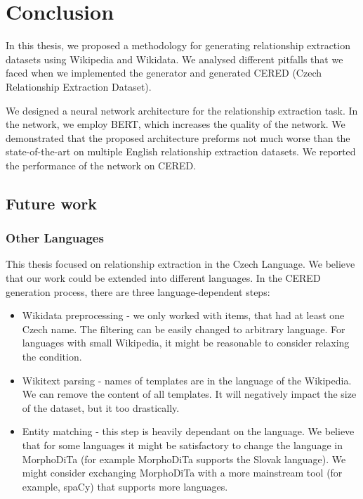 \chapter*{Conclusion}
In this thesis, we proposed a methodology for generating relationship extraction datasets using Wikipedia and Wikidata. We analysed different pitfalls that we faced when we implemented the generator and generated CERED (Czech Relationship Extraction Dataset). 

We designed a neural network architecture for the relationship extraction task. In the network, we employ BERT, which increases the quality of the network. We demonstrated that the proposed architecture preforms not much worse than the state-of-the-art on multiple English relationship extraction datasets. We reported the performance of the network on CERED.


\section{Future work}

\subsection{Other Languages}

This thesis focused on relationship extraction in the Czech  Language. We believe that our work could be extended into different languages. In the CERED generation process, there are three language-dependent steps:
\begin{itemize}
\item Wikidata preprocessing - we only worked with items, that had at least one Czech name. The filtering can be easily changed to arbitrary language. For languages with small Wikipedia, it might be reasonable to consider relaxing the condition.
\item Wikitext parsing - names of templates are in the language of the Wikipedia. We can remove the content of all templates. It will negatively impact the size of the dataset, but it too drastically.
\item Entity matching - this step is heavily dependant on the language. We believe that for some languages it might be satisfactory to change the language in MorphoDiTa (for example MorphoDiTa supports the Slovak language). We might consider exchanging MorphoDiTa with a more mainstream tool (for example, spaCy) that supports more languages.

\end{itemize}

